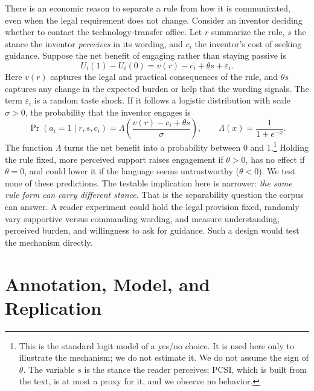 \documentclass[11pt]{article}
\begin{document}
There is an economic reason to separate a rule from how it is communicated, even when the legal requirement does not change. Consider an inventor deciding whether to contact the technology-transfer office. Let $r$ summarize the rule, $s$ the stance the inventor \emph{perceives} in its wording, and $c_i$ the inventor's cost of seeking guidance. Suppose the net benefit of engaging rather than staying passive is
\begin{equation}\label{eq:communication-cost}
U_i(1)-U_i(0)=v(r)-c_i+\theta s+\varepsilon_i.
\end{equation}
Here $v(r)$ captures the legal and practical consequences of the rule, and $\theta s$ captures any change in the expected burden or help that the wording signals. The term $\varepsilon_i$ is a random taste shock. If it follows a logistic distribution with scale $\sigma>0$, the probability that the inventor engages is
\begin{equation}\label{eq:engagement}
\Pr(a_i=1\mid r,s,c_i)=\Lambda\!\left(\frac{v(r)-c_i+\theta s}{\sigma}\right),\qquad
\Lambda(x)=\frac{1}{1+e^{-x}}.
\end{equation}
The function $\Lambda$ turns the net benefit into a probability between 0 and 1.\footnote{This is the standard logit model of a yes/no choice. It is used here only to illustrate the mechanism; we do not estimate it. We do not assume the sign of $\theta$. The variable $s$ is the stance the reader perceives; PCSI, which is built from the text, is at most a proxy for it, and we observe no behavior.} Holding the rule fixed, more perceived support raises engagement if $\theta>0$, has no effect if $\theta=0$, and could lower it if the language seems untrustworthy ($\theta<0$). We test none of these predictions. The testable implication here is narrower: \emph{the same rule form can carry different stance}. That is the separability question the corpus can answer. A reader experiment could hold the legal provision fixed, randomly vary supportive versus commanding wording, and measure understanding, perceived burden, and willingness to ask for guidance. Such a design would test the mechanism directly.

\section{Annotation, Model, and Replication}\label{app:model}
\setcounter{table}{0}
\end{document}
